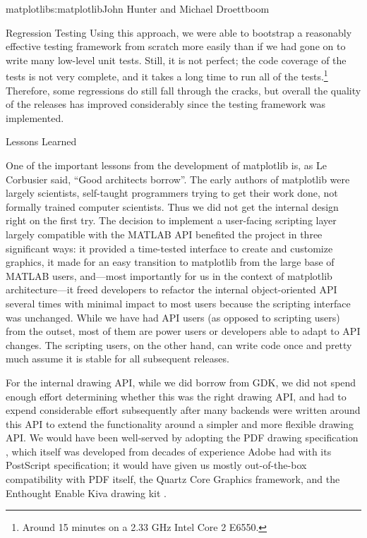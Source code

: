 \begin{aosachapter}{matplotlib}{s:matplotlib}{John Hunter and Michael Droettboom}
\begin{aosasect1}{Regression Testing}
Using this approach, we were able to bootstrap a reasonably effective
testing framework from scratch more easily than if we had gone on to
write many low-level unit tests.  Still, it is not perfect;  the code
coverage of the tests is not very complete, and it takes a long time to
run all of the tests.\footnote{Around 15 minutes on a 2.33 GHz Intel
  Core 2 E6550.}  Therefore, some regressions do still fall through
the cracks, but overall the quality of the releases has improved
considerably since the testing framework was implemented.

\end{aosasect1}

\begin{aosasect1}{Lessons Learned}

One of the important lessons from the development of matplotlib is,
as Le Corbusier said, ``Good architects borrow''.  The early authors
of matplotlib were largely scientists, self-taught programmers
trying to get their work done, not formally trained computer
scientists. Thus we did not get the internal design right on the
first try. The decision to implement a user-facing scripting layer
largely compatible with the MATLAB API benefited the project in
three significant ways: it provided a time-tested interface to
create and customize graphics, it made for an easy transition to
matplotlib from the large base of MATLAB users, and---most importantly
for us in the context of matplotlib architecture---it freed
developers to refactor the internal object-oriented API several
times with minimal impact to most users because the scripting
interface was unchanged.  While we have had API users (as opposed to
scripting users) from the outset, most of them are power users or
developers able to adapt to API changes.  The scripting users, on
the other hand, can write code once and pretty much assume it is
stable for all subsequent releases.

For the internal drawing API, while we did borrow from GDK, we did not
spend enough effort determining whether this was the right drawing
API, and had to expend considerable effort subsequently after many
backends were written around this API to extend the functionality
around a simpler and more flexible drawing API.  We would have been
well-served by adopting the PDF drawing specification \cite{bib:pdf},
which itself was developed from decades of experience Adobe had with
its PostScript specification; it would have given us mostly
out-of-the-box compatibility with PDF itself, the Quartz Core Graphics
framework, and the Enthought Enable Kiva drawing kit \cite{bib:kiva}.


\end{aosasect1}
\end{aosachapter}

